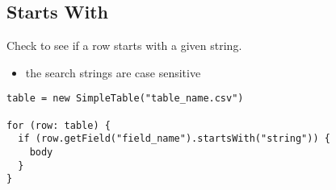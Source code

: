\documentclass{article}
\begin{document}
\subsection{Starts With}
Check to see if a row starts with a given string.
\begin{itemize}
  \item the search strings are case sensitive
\end{itemize}
\begin{lstlisting}
table = new SimpleTable("table_name.csv")

for (row: table) {
  if (row.getField("field_name").startsWith("string")) {
    body
  }
}
\end{lstlisting}


\newpage

%

\end{document}
